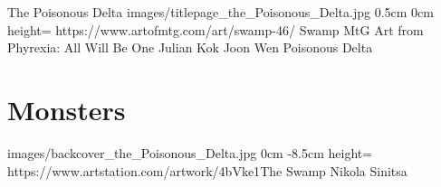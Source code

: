 \documentclass[letterpaper,openany,twoside,twocolumn]{book}
\begin{document}
	\regionTitlePage
		{The Poisonous Delta}
		{images/titlepage_the_Poisonous_Delta.jpg}
		{0.5cm}
		{0cm}
		{height=\paperheight}
		{https://www.artofmtg.com/art/swamp-46/}
		{Swamp MtG Art from Phyrexia: All Will Be One}
		{Julian Kok Joon Wen}
		{Poisonous Delta}
	
	\tableofcontents
	
	\mainmatter
	
	\MonsterSheetGeometry
	\part{Monsters}
	
	
	
	
	\renewcommand{\ThanksSpacing}{1cm}
	\bookLastPage
		{images/backcover_the_Poisonous_Delta.jpg}
		{0cm}
		{-8.5cm}
		{height=\paperheight}
		{https://www.artstation.com/artwork/4bVke1}{The Swamp}
		{Nikola Sinitsa}
		{}
\end{document}
